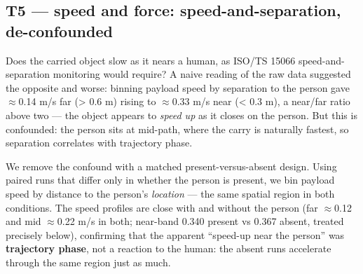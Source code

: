 \subsection{T5 --- speed and force: speed-and-separation, de-confounded}


Does the carried object slow as it nears a human, as ISO/TS 15066 speed-and-separation monitoring \citep{ref11} would require? A naive reading of the raw data suggested the opposite and worse: binning payload speed by separation to the person gave $\approx$0.14 m/s far (> 0.6 m) rising to $\approx$0.33 m/s near (< 0.3 m), a near/far ratio above two --- the object appears to \emph{speed up} as it closes on the person. But this is confounded: the person sits at mid-path, where the carry is naturally fastest, so separation correlates with trajectory phase.

We remove the confound with a matched present-versus-absent design. Using paired runs that differ only in whether the person is present, we bin payload speed by distance to the person's \emph{location} --- the same spatial region in both conditions. The speed profiles are close with and without the person (far $\approx$0.12 and mid $\approx$0.22 m/s in both; near-band 0.340 present vs 0.367 absent, treated precisely below), confirming that the apparent ``speed-up near the person'' was \textbf{trajectory phase}, not a reaction to the human: the absent runs accelerate through the same region just as much.

